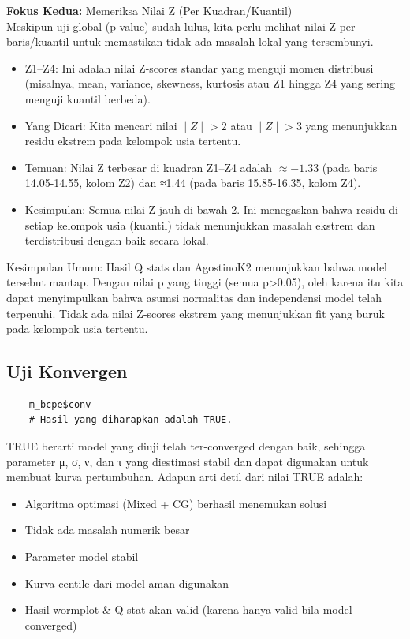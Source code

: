 \documentclass[11pt, a4paper]{article}
\begin{document}
\noindent
\textbf{Fokus Kedua:} Memeriksa Nilai Z (Per Kuadran/Kuantil)\\
Meskipun uji global (p-value) sudah lulus, kita perlu melihat nilai Z per baris/kuantil untuk memastikan tidak ada masalah lokal yang tersembunyi.
    \begin{itemize}
        \item Z1–Z4: Ini adalah nilai Z-scores standar yang menguji momen distribusi (misalnya, mean, variance, skewness, kurtosis atau Z1 hingga Z4 yang sering menguji kuantil berbeda).
        \item Yang Dicari: Kita mencari nilai $∣Z∣>2$ atau $∣Z∣>3$ yang menunjukkan residu ekstrem pada kelompok usia tertentu.
        \item Temuan: Nilai Z terbesar di kuadran  Z1–Z4 adalah $\approx-1.33$ (pada baris 14.05-14.55, kolom Z2) dan ≈1.44 (pada baris 15.85-16.35, kolom Z4).
        \item Kesimpulan: Semua nilai Z jauh di bawah 2. Ini menegaskan bahwa residu di setiap kelompok usia (kuantil) tidak menunjukkan masalah ekstrem dan terdistribusi dengan baik secara lokal.
    \end{itemize}
\item Kesimpulan Umum:
Hasil Q stats dan AgostinoK2 menunjukkan bahwa model tersebut mantap. Dengan nilai p yang tinggi (semua p>0.05), oleh karena itu kita dapat menyimpulkan bahwa asumsi normalitas dan independensi model telah terpenuhi. Tidak ada nilai Z-scores ekstrem yang menunjukkan fit yang buruk pada kelompok usia tertentu.

\subsection{Uji Konvergen}
    \begin{lstlisting}
    m_bcpe$conv
    # Hasil yang diharapkan adalah TRUE.
    \end{lstlisting}
TRUE berarti model yang diuji telah ter-converged dengan baik, sehingga parameter μ, σ, ν, dan τ yang diestimasi stabil dan dapat digunakan untuk membuat kurva pertumbuhan. Adapun arti detil dari nilai TRUE adalah:
\begin{itemize}
\item Algoritma optimasi (Mixed + CG) berhasil menemukan solusi
\item Tidak ada masalah numerik besar
\item Parameter model stabil
\item Kurva centile dari model aman digunakan
\item Hasil wormplot \& Q-stat akan valid (karena hanya valid bila model converged)
\end{itemize}
\end{document}
